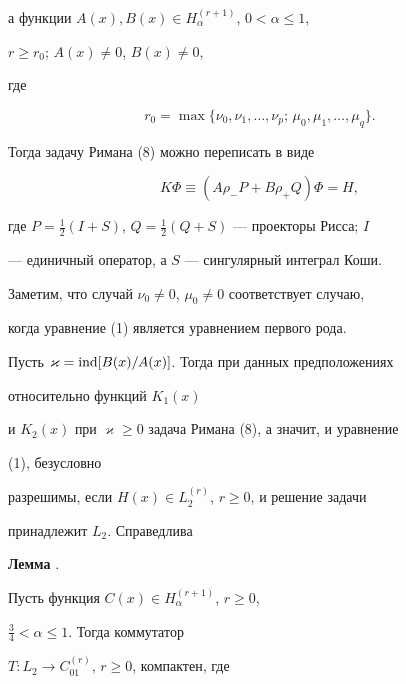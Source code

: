 а функции $A(x),B(x)\in H^{(r+1)}_\alpha$, $0<\alpha\le 1$, 


$r\ge r_0$; $A(x)\ne 0$, $B(x)\ne 0$, 


где 


\begin{equation} 


r_0=\max\{\nu_0,\nu_1,\dotsc,\nu_p;\, 


\mu_0,\mu_1,\dotsc,\mu_q\}. 


\end{equation} 


Тогда задачу Римана (8) можно переписать в виде 


\begin{equation} 


K\Phi\equiv(A\rho_-P+B\rho_+Q)\Phi=H, 


\end{equation} 


где $P=\frac{1}{2}(I+S)$, $Q=\frac{1}{2}(Q+S)$ --- проекторы Рисса; $I$ 


--- единичный оператор, а $S$ --- сингулярный интеграл Коши. 


 


Заметим, что случай $\nu_0\ne 0$, $\mu_0\ne 0$ соответствует случаю, 


когда уравнение (1) является уравнением первого рода. 


 


Пусть $\varkappa=\operatorname{ind}[B(x)/A(x)]$. Тогда при данных предположениях 


относительно функций $K_1(x)$ 


и $K_2(x)$ при $\varkappa\ge 0$ задача Римана (8), а значит, и уравнение 


(1), безусловно 


разрешимы, если $H(x)\in L^{(r)}_2$, $r\ge 0$, и решение задачи 


принадлежит $L_2$. Справедлива 


\medskip


 


{\bf Лемма} \cite{9}. {\it


Пусть функция $C(x)\in H^{(r+1)}_\alpha$, $r\ge 0$, 


$\frac{3}{4}<\alpha\le 1$. Тогда коммутатор 


$T:L_2\to C^{(r)}_{01}$, $r\ge 0$, компактен, где


}


